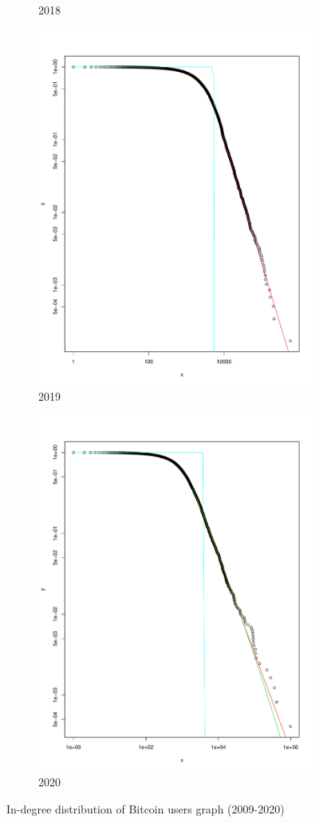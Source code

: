 \documentclass[preprint,12pt]{elsarticle}
\begin{document}
\begin{figure}[H]
\begin{subfigure}{.3\textwidth}
  \caption{2018}
  \label{fig:2018in}
\end{subfigure}
\begin{subfigure}{.3\textwidth}
  \centering
  \includegraphics[width=.8\linewidth]{Bitcoin-graphs/deg-dist-2019-in.pdf}  
  \caption{2019}
  \label{fig:2019in}
\end{subfigure}
\begin{subfigure}{.3\textwidth}
  \centering
  \includegraphics[width=.8\linewidth]{Bitcoin-graphs/deg-dist-in-2020.pdf}  
  \caption{2020}
  \label{fig:2020in}
\end{subfigure}
\caption{In-degree distribution of Bitcoin users graph (2009-2020)}
\label{fig:indegree}
\end{figure}
\end{document}
